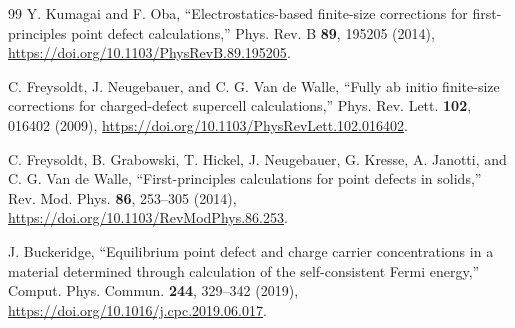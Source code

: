 \documentclass[aip,jap,reprint,amsmath,amssymb]{revtex4-2}
\begin{document}
\begin{thebibliography}{99}
Y. Kumagai and F. Oba,
``Electrostatics-based finite-size corrections for first-principles point defect calculations,''
Phys. Rev. B \textbf{89}, 195205 (2014),
\url{https://doi.org/10.1103/PhysRevB.89.195205}.

C. Freysoldt, J. Neugebauer, and C. G. Van de Walle,
``Fully ab initio finite-size corrections for charged-defect supercell calculations,''
Phys. Rev. Lett. \textbf{102}, 016402 (2009),
\url{https://doi.org/10.1103/PhysRevLett.102.016402}.

C. Freysoldt, B. Grabowski, T. Hickel, J. Neugebauer, G. Kresse, A. Janotti, and C. G. Van de Walle,
``First-principles calculations for point defects in solids,''
Rev. Mod. Phys. \textbf{86}, 253--305 (2014),
\url{https://doi.org/10.1103/RevModPhys.86.253}.

J. Buckeridge,
``Equilibrium point defect and charge carrier concentrations in a material determined through calculation of the self-consistent Fermi energy,''
Comput. Phys. Commun. \textbf{244}, 329--342 (2019),
\url{https://doi.org/10.1016/j.cpc.2019.06.017}.

\end{thebibliography}
\end{document}
